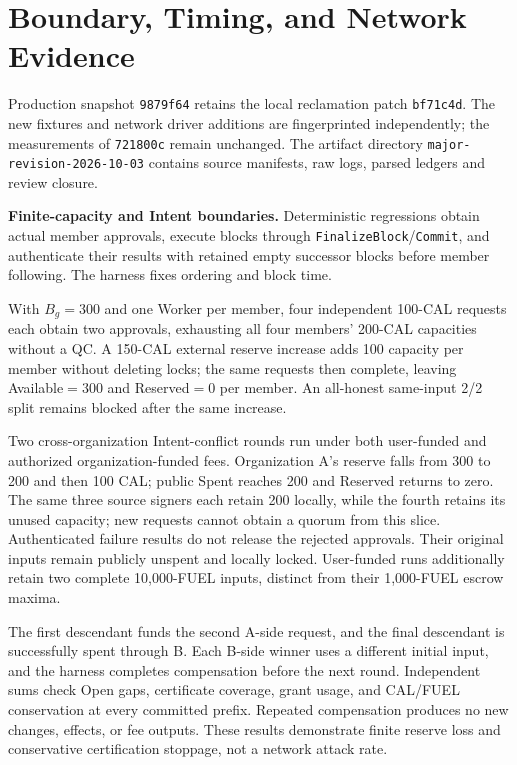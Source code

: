 \section{Boundary, Timing, and Network Evidence}
\label{supp:major-revision}
Production snapshot \texttt{9879f64} retains the local reclamation patch
\texttt{bf71c4d}. The new fixtures and network driver additions are
fingerprinted independently; the measurements of \texttt{721800c} remain
unchanged. The artifact directory \texttt{major-revision-2026-10-03}
contains source manifests, raw logs, parsed ledgers and review closure.

\noindent\textbf{Finite-capacity and Intent boundaries.}
Deterministic regressions obtain actual member approvals, execute
blocks through \texttt{FinalizeBlock}/\texttt{Commit}, and authenticate
their results with retained empty successor blocks before member
following. The harness fixes ordering and block time.

With $B_g=300$ and one Worker per member, four independent 100-CAL
requests each obtain two approvals, exhausting all four members'
200-CAL capacities without a QC. A 150-CAL external reserve increase
adds 100 capacity per member without deleting locks; the same requests
then complete, leaving Available$=300$ and Reserved$=0$ per member.
An all-honest same-input 2/2 split remains blocked after the same increase.

Two cross-organization Intent-conflict rounds run under both user-funded
and authorized organization-funded fees. Organization A's reserve falls
from 300 to 200 and then 100 CAL; public Spent reaches 200 and Reserved
returns to zero. The same three source signers each retain 200 locally,
while the fourth retains its unused capacity; new requests cannot obtain
a quorum from this slice. Authenticated failure results do not release
the rejected approvals. Their original inputs remain publicly unspent
and locally locked. User-funded runs additionally retain two complete
10,000-FUEL inputs, distinct from their 1,000-FUEL escrow maxima.

The first descendant funds the second A-side request, and the final
descendant is successfully spent through B. Each B-side winner uses a
different initial input, and the harness completes compensation before
the next round. Independent sums check Open gaps, certificate coverage,
grant usage, and CAL/FUEL conservation at every committed prefix.
Repeated compensation produces no new changes, effects, or fee outputs.
These results demonstrate finite reserve loss and conservative
certification stoppage, not a network attack rate.


